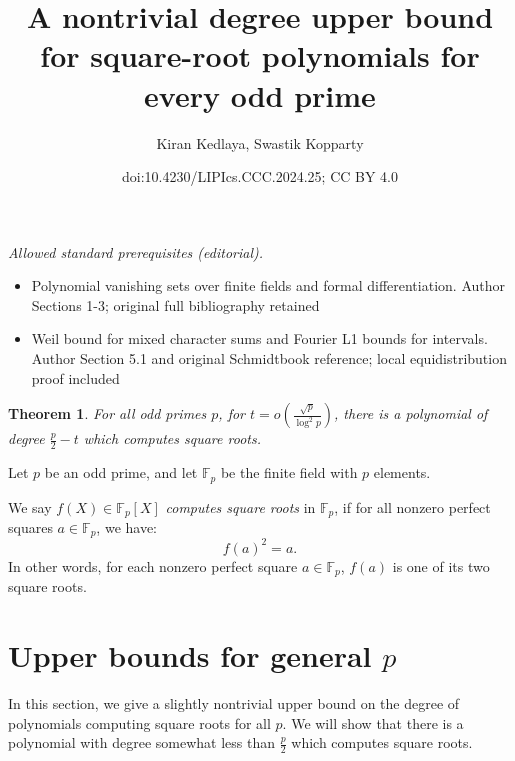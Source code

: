 \documentclass[10pt,a4paper]{article}
\title{A nontrivial degree upper bound for square-root polynomials for every odd prime}
\author{Kiran Kedlaya, Swastik Kopparty}
\date{doi:10.4230/LIPIcs.CCC.2024.25; CC BY 4.0}
\newtheorem{theorem}{Theorem}[section]
\newcommand{\F}{\mathbb{F}}
\begin{document}
\maketitle
\setcounter{section}{5}
\noindent\textit{Allowed standard prerequisites (editorial).}\begin{itemize}
\item Polynomial vanishing sets over finite fields and formal differentiation. Author Sections 1-3; original full bibliography retained
\item Weil bound for mixed character sums and Fourier L1 bounds for intervals. Author Section 5.1 and original Schmidtbook reference; local equidistribution proof included
\end{itemize}\medskip
\begin{theorem}
 For all odd primes $p$, for $t = o\left(\frac{\sqrt{p}}{\log^2 p} \right)$, there is a polynomial of degree $\frac{p}{2} - t$ which computes square roots.
\end{theorem}

Let $p$ be an odd prime, and let $\F_p$ be the finite field with $p$ elements.

We say $f(X) \in \F_p[X]$ {\em computes square roots} in $\F_p$, if
for all nonzero perfect squares $a \in \F_p$, we have:
$$f(a)^2 = a.$$ In other words, for each nonzero perfect square $a \in \F_p$, $f(a)$ is one of its two square roots.

\section{Upper bounds for general $p$}


In this section, we give a slightly nontrivial upper bound on the degree of polynomials computing square roots for all $p$.
We will show that there is a polynomial with degree somewhat less than $\frac{p}{2}$ which computes square roots.
\end{document}
